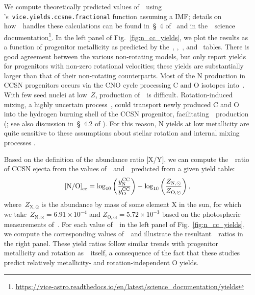 \documentclass[ms.tex]{subfiles}
\begin{document}
We compute theoretically predicted values of~~using
\vice's~\texttt{vice.yields.ccsne.fractional} function assuming a
\citet{Kroupa2001} IMF; details on how~\vice~handles these calculations can be
found in~\S~4 of~\citet{Griffith2021a} and in the~\vice~science 
documentation\footnote{
\url{https://vice-astro.readthedocs.io/en/latest/science_documentation/yields}
}.
In the left panel of Fig.~\ref{fig:n_cc_yields}, we plot the results as a
function of progenitor metallicity as predicted by the~\citet{Woosley1995},
\citet*{Nomoto2013},~\citet{Sukhbold2016}, and~\citet{Limongi2018} tables.
There is good agreement between the various non-rotating models, but only
\citet{Limongi2018} report yields for progenitors with non-zero rotational
velocities; these yields are substantially larger than that of their
non-rotating counterparts.
Most of the N production in CCSN progenitors occurs via the CNO cycle
processing C and O isotopes into~\Nfourteen. 
With few seed nuclei at low~$Z$, production of~\Nfourteen~is difficult.
Rotation-induced mixing, a highly uncertain process~\citep{Zahn1992, Maeder1998,
Lagarde2012}, could transport newly produced C and O into the hydrogen burning
shell of the CCSN progenitor, facilitating~\Nfourteen~production
(\citealp{Frischknecht2016}; see also discussion in~\S~4.2 of
\citealp{Andrews2017}).
For this reason, N yields at low metallicity are quite sensitive to these
assumptions about stellar rotation and internal mixing processes
\citep{Heger2010}.
\par
Based on the definition of the abundance ratio [X/Y], we can compute
the~\no~ratio of CCSN ejecta from the values of~~and~~predicted
from a given yield table:
\begin{equation}
\text{[N/O]}_\text{cc} = 
\log_{10}\left(\frac{y_\text{N}^\text{CC}}{y_\text{O}^\text{CC}}\right) -
\log_{10}\left(\frac{Z_{\text{N},\odot}}{Z_{\text{O},\odot}}\right),
\label{eq:no_subcc}
\end{equation}
where~$Z_{\text{X},\odot}$ is the abundance by mass of some element X in the
sun, for which we take~$Z_{\text{N},\odot} = 6.91\times10^{-4}$ and
$Z_{\text{O},\odot} = 5.72\times10^{-3}$ based on the photospheric measurements
of~\citet{Asplund2009}.
For each value of~~in the left panel of Fig.~\ref{fig:n_cc_yields}, we
compute the corresponding values of~~and illustrate the
resultant~\no\subcc~ratios in the right panel.
These yield ratios follow similar trends with progenitor metallicity and
rotation as~~itself, a consequence of the fact that these
studies predict relatively metallicity- and rotation-independent O yields.
\end{document}

